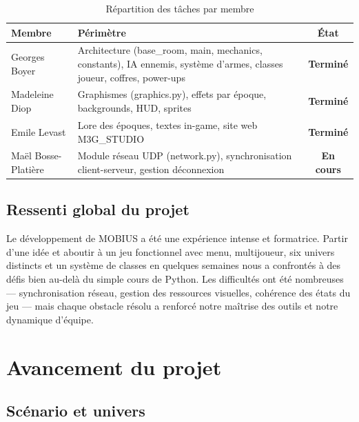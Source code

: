 \documentclass[12pt, a4paper]{report}
\begin{document}
\begin{table}[H]
\centering
\caption{R\'{e}partition des t\^{a}ches par membre}
\begin{tabularx}{\textwidth}{|l|X|c|}
\hline
\textbf{Membre} & \textbf{P\'{e}rim\`{e}tre} & \textbf{\'{E}tat} \\
\hline
Georges Boyer     & Architecture (base\_room, main, mechanics, constants), IA ennemis, syst\`{e}me d'armes, classes joueur, coffres, power-ups & \textcolor{okgreen}{\textbf{Termin\'{e}}} \\
\hline
Madeleine Diop    & Graphismes (graphics.py), effets par \'{e}poque, backgrounds, HUD, sprites & \textcolor{okgreen}{\textbf{Termin\'{e}}} \\
\hline
Emile Levast      & Lore des \'{e}poques, textes in-game, site web M3G\_STUDIO & \textcolor{okgreen}{\textbf{Termin\'{e}}} \\
\hline
Ma\"{e}l Bosse-Plati\`{e}re & Module r\'{e}seau UDP (network.py), synchronisation client-serveur, gestion d\'{e}connexion & \textcolor{warnorange}{\textbf{En cours}} \\
\hline
\end{tabularx}
\end{table}

\section{Ressenti global du projet}

Le d\'{e}veloppement de MOBIUS a \'{e}t\'{e} une exp\'{e}rience intense et formatrice. Partir d'une id\'{e}e et aboutir \`{a} un jeu fonctionnel avec menu, multijoueur, six univers distincts et un syst\`{e}me de classes en quelques semaines nous a confront\'{e}s \`{a} des d\'{e}fis bien au-del\`{a} du simple cours de Python. Les difficult\'{e}s ont \'{e}t\'{e} nombreuses --- synchronisation r\'{e}seau, gestion des ressources visuelles, coh\'{e}rence des \'{e}tats du jeu --- mais chaque obstacle r\'{e}solu a renforc\'{e} notre ma\^{i}trise des outils et notre dynamique d'\'{e}quipe.

\chapter{Avancement du projet}

\section{Sc\'{e}nario et univers}
\end{document}
